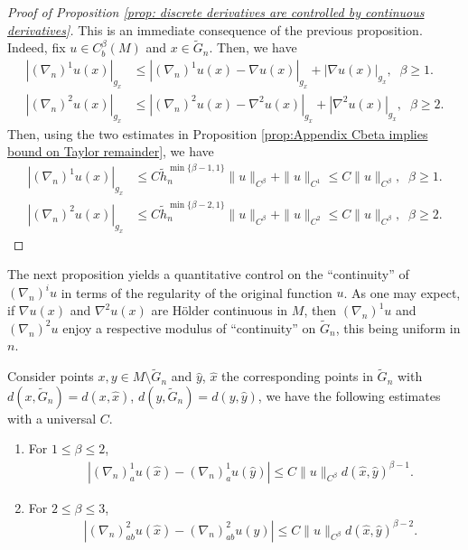 \documentclass[11pt,reqno]{amsart}
\numberwithin{equation}{section}
\theoremstyle{plain}
\begin{document}
\begin{proof}[Proof of Proposition \ref{prop: discrete derivatives are controlled by continuous derivatives}]
   This is an immediate consequence of the previous proposition. Indeed, fix $u \in C^\beta_b(M)$ and $x\in \tilde G_n$. Then, we have
  \begin{align*}
    |(\nabla_n)^1u(x)|_{g_x} & \leq |(\nabla_n)^1u(x)-\nabla u(x)|_{g_x} +|\nabla u(x)|_{g_x},\;\; \beta \geq 1.\\
    |(\nabla_n)^2u(x)|_{g_x} & \leq |(\nabla_n)^2u(x)-\nabla^2 u(x)|_{g_x}+|\nabla^2 u(x)|_{g_x},\;\;\beta \geq 2.
  \end{align*}  
  Then, using the two estimates in Proposition \ref{prop:Appendix Cbeta implies bound on Taylor remainder}, we have
  \begin{align*}
    |(\nabla_n)^1u(x)|_{g_x} & \leq C\tilde h_n^{\min\{\beta-1,1\} } \|u\|_{C^\beta}+\|u\|_{C^1} \leq C\|u\|_{C^\beta},\;\;\beta \geq 1.\\
    |(\nabla_n)^2u(x)|_{g_x} & \leq C\tilde h_n^{\min\{\beta-2,1\}}\|u\|_{C^\beta}+\|u\|_{C^2} \leq C\|u\|_{C^\beta},\;\;\beta \geq 2.
  \end{align*}

\end{proof}

The next proposition yields a quantitative control on the ``continuity'' of $(\nabla_n)^{i}u$ in terms of the regularity of the original function $u$. As one may expect, if $\nabla u(x)$ and $\nabla^2u(x)$ are H\"older continuous in $M$, then $(\nabla_n)^1u$ and $(\nabla_n)^2u$ enjoy a respective modulus of ``continuity'' on $\tilde G_n$, this being uniform in $n$. 
\begin{prop}\label{prop:InterpolatedDerivativesAreRegular}
  Consider points $x,y \in M \setminus \tilde G_n$ and $\hat y$, $\hat x$ the corresponding points in $\tilde G_n$ with $d(x,\tilde G_n)=d(x,\hat x)$, $d(y,\tilde G_n)=d(y,\hat y)$, we have the following estimates with a universal $C$.

  \begin{enumerate}
  \item For $1\leq \beta\leq 2$,
  \begin{align*}
    & |(\nabla_n)_a^1 u(\hat x)-(\nabla_n)_a^1 u(\hat y)| \leq C\|u\|_{C^\beta}d(\hat x,\hat y)^{\beta-1}.
  \end{align*}
  \item For $2\leq \beta\leq3$,
  \begin{align*}
    & | (\nabla_n)_{ab}^2 u(\hat x)-(\nabla_n)_{ab}^2u(\hat y)| \leq C\|u\|_{C^\beta}d(\hat x,\hat y)^{\beta-2}.
  \end{align*}
  \end{enumerate}
  
\end{prop}
\end{document}
